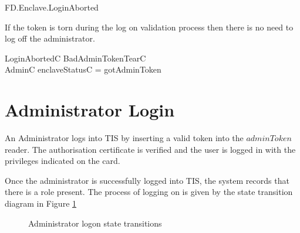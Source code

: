 \begin{traceunit}{FD.Enclave.LoginAborted}
\end{traceunit}

If the token is torn during the log on validation process then there
is no need to log off the administrator.

\begin{schema}{LoginAbortedC}
        BadAdminTokenTearC
\\      \Xi AdminC
\where
        enclaveStatusC = gotAdminToken
\end{schema}



\section{Administrator Login}


An Administrator logs into TIS by inserting a valid token
into the $adminToken$ reader. The authorisation certificate is
verified and the user is logged in with the privileges indicated on
the card.

Once the administrator is successfully logged into TIS, the system
records that there is a role present. The process of logging on is
given by the state transition diagram in Figure \ref{fig:logon}

\begin{figure}[htbp]
  \begin{center}
    \leavevmode
    \caption{Administrator logon state transitions}
    \label{fig:logon}
  \end{center}
\end{figure}

